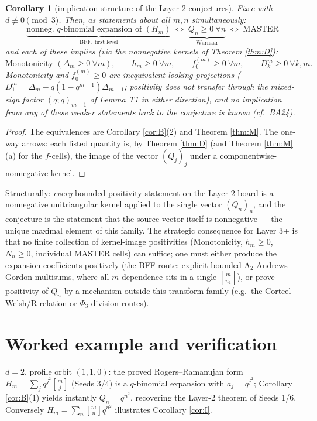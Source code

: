 \documentclass[11pt]{article}
\newtheorem{corollary}[theorem]{Corollary}
\newcommand{\qbin}[2]{\genfrac{[}{]}{0pt}{}{#1}{#2}}
\begin{document}
\begin{corollary}[implication structure of the Layer-2 conjectures]\label{cor:C}
Fix $c$ with $d\not\equiv0\pmod3$. Then, as statements about all $m,n$ simultaneously:
\[
\underbrace{\text{nonneg.\ $q$-binomial expansion of }(H_m)}_{\text{BFF, first level}}
\;\Longleftrightarrow\;
\underbrace{Q_n\ge0\ \forall n}_{\text{Warnaar}}
\;\Longleftrightarrow\;
\text{MASTER}
\]
and each of these implies (via the nonnegative kernels of Theorem \ref{thm:D}):
\[
\text{Monotonicity }(\Delta_m\ge0\ \forall m),\qquad
h_m\ge0\ \forall m,\qquad
f_0^{(m)}\ge0\ \forall m,\qquad
D_k^m\ge 0\ \forall k,m .
\]
Monotonicity and $f_0^{(m)}\ge0$ are inequivalent-looking projections
($D_1^m=\Delta_m-q(1-q^{m-1})\Delta_{m-1}$; positivity does not transfer through the
mixed-sign factor $(q;q)_{m-1}$ of Lemma T1 in either direction), and no implication from
any of these weaker statements back to the conjecture is known (cf.\ BA24).
\end{corollary}

\begin{proof}
The equivalences are Corollary \ref{cor:B}(2) and Theorem \ref{thm:M}. The one-way arrows:
each listed quantity is, by Theorem \ref{thm:D} (and Theorem \ref{thm:M}(a) for the
$f$-cells), the image of the vector $(Q_j)_j$ under a componentwise-nonnegative kernel.
\end{proof}

Structurally: \emph{every} bounded positivity statement on the Layer-2 board is a
nonnegative unitriangular kernel applied to the single vector $(Q_n)_n$, and the
conjecture is the statement that the source vector itself is nonnegative --- the unique
maximal element of this family. The strategic consequence for Layer 3+ is that no
finite collection of kernel-image positivities (Monotonicity, $h_m\ge0$, $N_n\ge0$,
individual MASTER cells) can suffice; one must either produce the expansion coefficients
positively (the BFF route: explicit bounded $\mathrm{A}_2$ Andrews--Gordon multisums,
where all $m$-dependence sits in a single $\qbin{m}{n_1}$), or prove positivity of $Q_n$
by a mechanism outside this transform family (e.g.\ the Corteel--Welsh/R-relation or
$\Phi_3$-division routes).

\section{Worked example and verification}

$d=2$, profile orbit $(1,1,0)$: the proved Rogers--Ramanujan form
$H_m=\sum_j q^{j^2}\qbin{m}{j}$ (Seeds 3/4) is a $q$-binomial expansion with
$a_j=q^{j^2}$; Corollary \ref{cor:B}(1) yields instantly $Q_n=q^{n^2}$, recovering the
Layer-2 theorem of Seeds 1/6. Conversely $H_m=\sum_n\qbin{m}{n}q^{n^2}$ illustrates
Corollary \ref{cor:I}.
\end{document}
